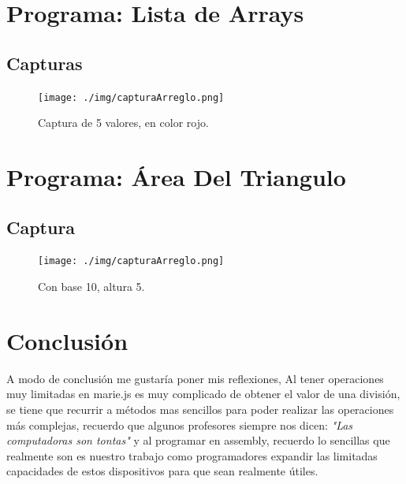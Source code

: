 \documentclass[12pt]{article}
\begin{document}
\section*{Programa: Lista de Arrays}
\label{sec:org67a5676}


\subsection*{Capturas}
\label{sec:org8c142ed}
\begin{figure}[htbp]
\centering
\texttt{[image: ./img/capturaArreglo.png]}
\caption{Captura de 5 valores, en color rojo.}
\end{figure}

\pagebreak

\section*{Programa: Área Del Triangulo}
\label{sec:org64eb337}


\subsection*{Captura}
\label{sec:orgbd9bb05}
\begin{figure}[htbp]
\centering
\texttt{[image: ./img/capturaArreglo.png]}
\caption{Con base 10, altura 5.}
\end{figure}

\section*{Conclusión}
\label{sec:org8c2fde4}
\begin{mdframed}
A modo de conclusión me gustaría poner mis reflexiones, Al tener operaciones muy limitadas en marie.js es muy complicado de obtener el valor de una división, se tiene que recurrir a métodos mas sencillos para poder realizar las operaciones más complejas, recuerdo que algunos profesores siempre nos dicen: \emph{"Las computadoras son tontas"} y al programar en assembly, recuerdo lo sencillas que realmente son es nuestro trabajo como programadores expandir las limitadas capacidades de estos dispositivos para que sean realmente útiles.
\end{mdframed}
\end{document}
